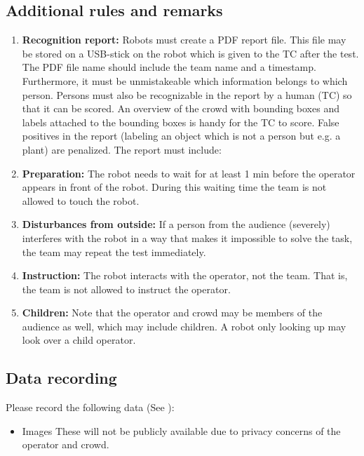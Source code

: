 \subsection{Additional rules and remarks}
\begin{enumerate}
\item \textbf{Recognition report:} 
  Robots must create a PDF report file.
  This file may be stored on a USB-stick on the robot which is given to the TC after the test. 
  The PDF file name should include the team name and a timestamp. 
  Furthermore, it must be unmistakeable which information belongs to which person. 
  Persons must also be recognizable in the report by a human (TC) so that it can be scored. 
  An overview of the crowd with bounding boxes and labels attached to the bounding boxes is handy for the TC to score.
  False positives in the report (labeling an object which is not a person but e.g. a plant) are penalized.
  The report must include:

\item \textbf{Preparation:} The robot needs to wait for at least 1 min before the operator appears in front of the robot. During this waiting time the team is not allowed to touch the robot.
\item \textbf{Disturbances from outside:} If a person from the audience (severely) interferes with the robot in a way that makes it impossible to solve the task, the team may repeat the test immediately.
\item \textbf{Instruction:} The robot interacts with the operator, not the team. That is, the team is not allowed to instruct the operator.
\item \textbf{Children:} Note that the operator and crowd may be members of the audience as well, which may include children. A robot only looking up may look over a child operator. 
\end{enumerate}

\subsection{Data recording}
  Please record the following data (See ):
  \begin{itemize}
   \item Images These will not be publicly available due to privacy concerns of the operator and crowd. 
  \end{itemize}


